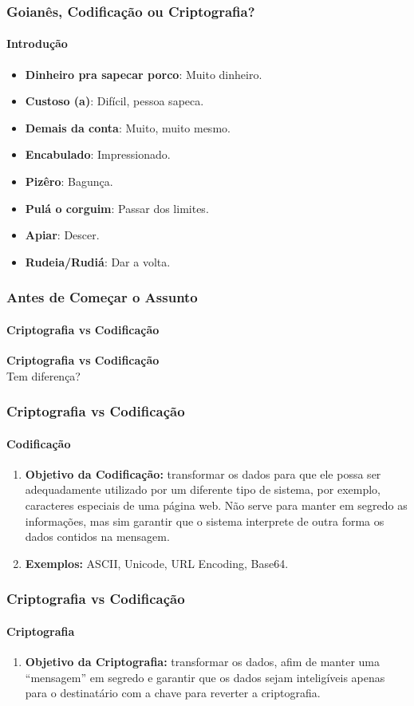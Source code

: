 \documentclass[compress]{beamer}
\begin{document}
\begin{frame}
\frametitle{Goianês, Codificação ou Criptografia?}
\framesubtitle{Introdução}
	\begin{itemize}
		\justifying
		\item<+->{\textbf{Dinheiro pra sapecar porco}: Muito dinheiro.}
		\item<+->{\textbf{Custoso (a)}: Difícil, pessoa sapeca.}
		\item<+->{\textbf{Demais da conta}: Muito, muito mesmo.}
		\item<+->{\textbf{Encabulado}: Impressionado.}
		\item<+->{\textbf{Pizêro}: Bagunça.}
		\item<+->{\textbf{Pulá o corguim}: Passar dos limites.}
		\item<+->{\textbf{Apiar}: Descer.}
		\item<+->{\textbf{Rudeia/Rudiá}: Dar a volta.}
	\end{itemize}
\end{frame}

\begin{frame}
\frametitle{Antes de Começar o Assunto}
\framesubtitle{Criptografia vs Codificação}
\centering 
\textbf{\Huge Criptografia vs Codificação}\\
{\Huge Tem diferença?}
\end{frame}

\begin{frame}
\frametitle{Criptografia vs Codificação}
\framesubtitle{Codificação}
	\begin{enumerate}
		\justifying
		\item<+->{\textbf{Objetivo da Codificação:} transformar os dados para que ele possa ser adequadamente utilizado por um diferente tipo de sistema, por exemplo, caracteres especiais de uma página web. Não serve para manter em segredo as informações, mas sim garantir que o sistema interprete de outra forma os dados contidos na mensagem.}
		\item<+->{\textbf{Exemplos:} ASCII, Unicode, URL Encoding, Base64.}
	\end{enumerate}
\end{frame}

\begin{frame}
\frametitle{Criptografia vs Codificação}
\framesubtitle{Criptografia}
	\begin{enumerate}
		\justifying
		\item<+->{\textbf{Objetivo da Criptografia:} transformar os dados, afim de manter uma “mensagem” em segredo e garantir que os dados sejam inteligíveis apenas para o destinatário com a chave para reverter a criptografia.}
	\end{enumerate}
\end{frame}
\end{document}
